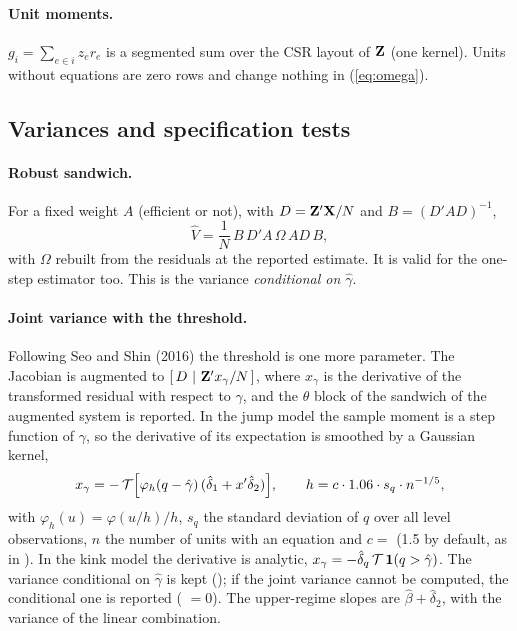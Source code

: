 \documentclass[
  10.5pt,
  a4paper,
]{article}
\begin{document}
\paragraph{Unit moments.} $g_i=\sum_{e\in i}z_e r_e$ is a segmented sum over the CSR layout of $\mathbf{Z}$
(one kernel). Units without equations are zero rows and change nothing in (\ref{eq:omega}).

\subsection{Variances and specification tests}\label{note:var}

\paragraph{Robust sandwich.} For a fixed weight $A$ (efficient or not), with $D=\mathbf{Z}'\mathbf{X}/N$ and
$B=(D'AD)^{-1}$,
\begin{equation}\label{eq:sandwich}
\widehat V=\frac1N\,B\,D'A\,\Omega\,A D\,B,
\end{equation}
with $\Omega$ rebuilt from the residuals at the reported estimate. It is valid for the one-step
estimator too. This is the variance \emph{conditional on $\hat\gamma$}.

\paragraph{Joint variance with the threshold.} Following Seo and Shin (2016) the threshold is one more
parameter. The Jacobian is augmented to $[\,D\ |\ \bZ'x_\gamma/N\,]$, where $x_\gamma$ is the
derivative of the transformed residual with respect to $\gamma$, and the $\theta$ block of the
sandwich of the augmented system is reported. In the jump model the sample moment is a step function
of $\gamma$, so the derivative of its expectation is smoothed by a Gaussian kernel,
\begin{equation}\label{eq:xg}
x_\gamma=-\,\mathcal T\Bigl[\varphi_h(q-\hat\gamma)\,(\hat\delta_1+x'\hat\delta_2)\Bigr],\qquad
h=c\cdot1.06\cdot s_q\cdot n^{-1/5},
\end{equation}
with $\varphi_h(u)=\varphi(u/h)/h$, $s_q$ the standard deviation of $q$ over all level observations,
$n$ the number of units with an equation and $c=$  (1.5 by default, as in
). In the kink model the derivative is analytic, $x_\gamma=-\hat\delta_q\,\mathcal T\,\mathbf{1}(q>\hat\gamma)$.
The variance conditional on $\hat\gamma$ is kept (); if the joint variance cannot be
computed, the conditional one is reported ( $=0$). The upper-regime slopes are
$\hat\beta+\hat\delta_2$, with the variance of the linear combination.
\end{document}
